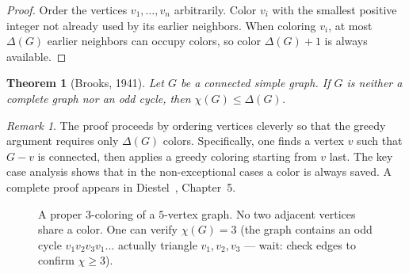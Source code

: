 \documentclass[12pt,a4paper]{article}
\theoremstyle{definition}
\theoremstyle{plain}
\newtheorem{theorem}{Theorem}[section]
\theoremstyle{remark}
\newtheorem{remark}{Remark}[section]
\begin{document}
\begin{proof}
  Order the vertices $v_1,\ldots,v_n$ arbitrarily.  Color $v_i$ with the
  smallest positive integer not already used by its earlier neighbors.  When
  coloring $v_i$, at most $\Delta(G)$ earlier neighbors can occupy colors, so
  color $\Delta(G)+1$ is always available.
\end{proof}

\begin{theorem}[Brooks, 1941]\label{thm:brooks}
  Let $G$ be a connected simple graph.  If $G$ is neither a complete graph nor
  an odd cycle, then $\chi(G) \leq \Delta(G)$.
\end{theorem}

\begin{remark}\label{rem:brooks-sketch}
  The proof proceeds by ordering vertices cleverly so that the greedy argument
  requires only $\Delta(G)$ colors.  Specifically, one finds a vertex $v$ such
  that $G - v$ is connected, then applies a greedy coloring starting from $v$
  last.  The key case analysis shows that in the non-exceptional cases a
  color is always saved.  A complete proof appears in Diestel~\cite{diestel2017},
  Chapter~5.
\end{remark}

\begin{figure}[htbp]
  \centering
  \caption{A proper $3$-coloring of a $5$-vertex graph.  No two adjacent
           vertices share a color.  One can verify $\chi(G)=3$ (the graph
           contains an odd cycle $v_1v_2v_3v_1$... actually triangle
           $v_1,v_2,v_3$ — wait: check edges to confirm $\chi \geq 3$).}
  \label{fig:3-coloring}
\end{figure}
\end{document}
